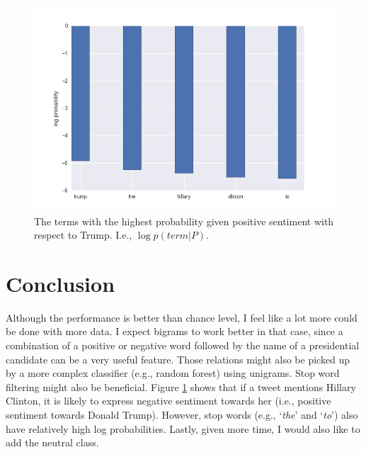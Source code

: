 \documentclass{article}
\begin{document}
\begin{figure}
\centering
\includegraphics[width=\textwidth]{logprobs.png}
\caption{The terms with the highest probability given positive sentiment with respect to Trump. I.e., $\log p(term|P)$.}
\label{fig:logprobs}
\end{figure}

\section{Conclusion}
Although the performance is better than chance level, I feel like a lot more could be done with more data. I expect bigrams to work better in that case, since a combination of a positive or negative word followed by the name of a presidential candidate can be a very useful feature. Those relations might also be picked up by a more complex classifier (e.g., random forest) using unigrams. Stop word filtering might also be beneficial. Figure \ref{fig:logprobs} shows that if a tweet mentions Hillary Clinton, it is likely to express negative sentiment towards her (i.e., positive sentiment towards Donald Trump). However, stop words (e.g., `\emph{the}' and `\emph{to}') also have relatively high log probabilities. Lastly, given more time, I would also like to add the neutral class.
\end{document}
